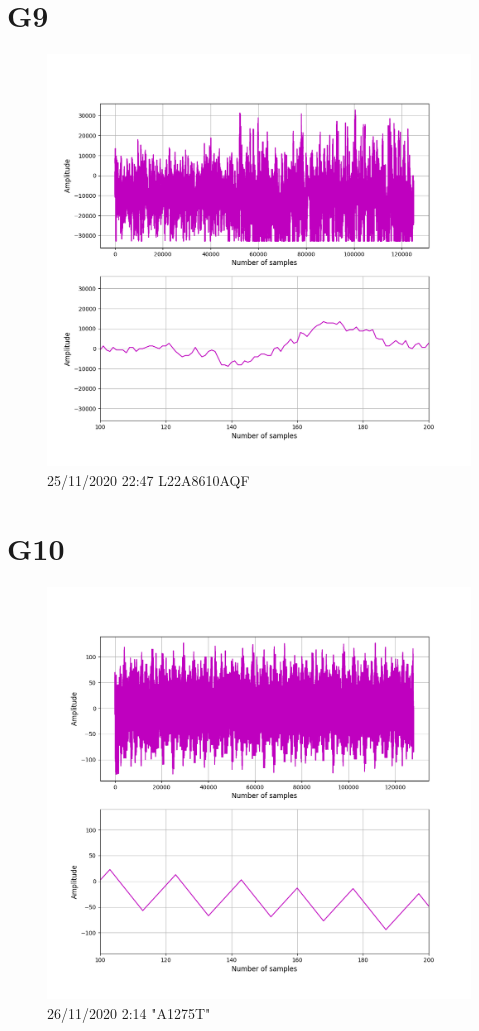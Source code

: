 \documentclass[hidelinks, 12pt, a4paper]{article}
\begin{document}
\section{G9}

\begin{figure}[h!]
\centering
	\includegraphics[height=.38\textheight, width=\textwidth]{assets/session1/g9_aq.png}
	\caption{25/11/2020 22:47 L22A8610AQF} 
\end{figure}


\section{G10}

\begin{figure}[h!]
\centering
	\includegraphics[height=.38\textheight, width=\textwidth]{assets/session1/g10.png}
    \caption{26/11/2020 2:14 "A1275T"}
\end{figure}
\end{document}
